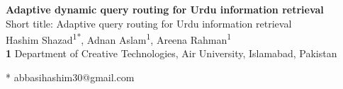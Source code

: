 \documentclass[10pt,letterpaper]{article}
\begin{document}
\vspace*{0.2in}

\begin{flushleft}
{\Large
\textbf{Adaptive dynamic query routing for Urdu information retrieval} %
}
\newline
\\
Short title: Adaptive query routing for Urdu information retrieval
\newline
\\
Hashim Shazad\textsuperscript{1*},
Adnan Aslam\textsuperscript{1},
Areena Rahman\textsuperscript{1}
\\
\bigskip
\textbf{1} Department of Creative Technologies, Air University, Islamabad, Pakistan
\\
\bigskip

%
%





* abbasihashim30@gmail.com

\end{flushleft}
\end{document}
